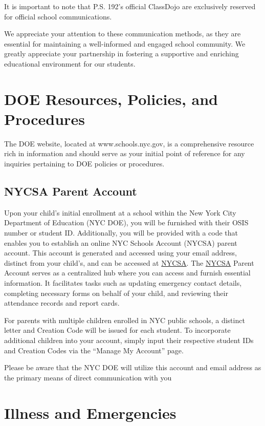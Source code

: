 \documentclass[letterpaper, 11pt]{article}
\begin{document}
It is important to note that P.S. 192’s official ClassDojo are exclusively reserved for official school communications.

We appreciate your attention to these communication methods, as they are essential for maintaining a well-informed and engaged school community. We greatly appreciate your partnership in fostering a supportive and enriching educational environment for our students.

\section{DOE Resources, Policies, and Procedures}
\label{sec:orgab2849b}
The DOE website, located at www.schools.nyc.gov, is a comprehensive resource rich in information and should serve as your initial point of reference for any inquiries pertaining to DOE policies or procedures.

\subsection{NYCSA Parent Account}
\label{sec:orged108bf}
Upon your child’s initial enrollment at a school within the New York City Department of Education (NYC DOE), you will be furnished with their OSIS number or student ID. Additionally, you will be provided with a code that enables you to establish an online NYC Schools Account (NYCSA) parent account. This account is generated and accessed using your email address, distinct from your child’s, and can be accessed at \href{https://www.schoolsaccount.nyc/}{NYCSA}. The  \href{https://www.schoolsaccount.nyc/}{NYCSA} Parent Account serves as a centralized hub where you can access and furnish essential information. It facilitates tasks such as updating emergency contact details, completing necessary forms on behalf of your child, and reviewing their attendance records and report cards.

For parents with multiple children enrolled in NYC public schools, a distinct letter and Creation Code will be issued for each student. To incorporate additional children into your account, simply input their respective student IDs and Creation Codes via the ``Manage My Account'' page.

Please be aware that the NYC DOE will utilize this account and email address as the primary means of direct communication with you

\section{Illness and Emergencies}
\label{sec:org43eefdf}
\end{document}
